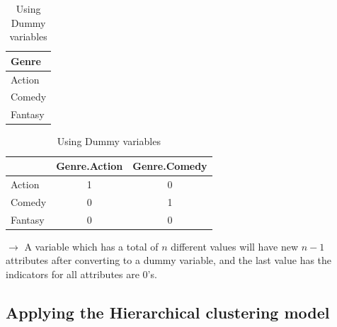 \begin{table}[h]
\centering
 \begin{subtable}[b]{0.45\linewidth}
    \centering
      \begin{tabular}{|l|}
        \hline
          \cellcolor{blue!25}Genre \\
        \hline
         Action \\
         \hline
         Comedy \\
         \hline
          Fantasy \\
          \hline
       \end{tabular}
       \caption{Original "Genre" variable}
    \end{subtable}%
 \begin{subtable}[b]{0.45\linewidth}
        \centering
        \begin{tabular}{|l|c|c|}
            \hline
             & Genre.Action & Genre.Comedy \\
            \hline
            Action & 1 & 0 \\
            \hline
            Comedy & 0 & 1 \\
            \hline
            Fantasy & 0 & 0 \\
            \hline
        \end{tabular}
        \caption{"Genre" Dummy variable}
    \end{subtable}
    \caption{Using Dummy variables}
\end{table}

$\rightarrow $ A variable which has a total of $n$ different values will have new $n - 1$ attributes after converting to a dummy variable, and the last value has the indicators for all attributes are 0's.


\subsection{Applying the Hierarchical clustering model}

